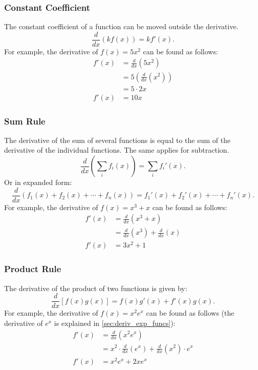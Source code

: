 \documentclass[12pt]{article}
\begin{document}
\subsubsection{Constant Coefficient}
The constant coefficient of a function can be moved outside the derivative.
\[ \frac{d}{dx} \left( k f(x) \right) = k f'(x). \]
For example, the derivative of $f(x) = 5x^2$ can be found as follows:
\begin{align*}
	f'(x) &= \frac{d}{dx} \left( 5x^2 \right) \\[5pt]
	&= 5 \left( \frac{d}{dx} \left( x^2 \right) \right) \\
	&= 5 \cdot 2x \\
	f'(x) &= 10x
\end{align*}

\subsubsection{Sum Rule}
The derivative of the sum of several functions is equal to the sum of the derivative of the individual functions. The same applies for subtraction.
\[ \frac{d}{dx} \left( \sum_i f_i(x) \right) = \sum_i f_i'(x). \]
Or in expanded form:
\[ \frac{d}{dx} \left( f_1(x) + f_2(x) + \cdots + f_n(x) \right) = f_1'(x) + f_2'(x) + \cdots + f_n'(x). \]
For example, the derivative of $f(x) = x^3 + x$ can be found as follows:
\begin{align*}
	f'(x) &= \frac{d}{dx} \left( x^3 + x \right) \\[5pt]
	&= \frac{d}{dx} \left( x^3 \right) + \frac{d}{dx} (x) \\[5pt]
	f'(x) &= 3x^2 + 1
\end{align*}

\subsubsection{Product Rule}
The derivative of the product of two functions is given by:
\[ \frac{d}{dx} \left[ f(x) g(x) \right] = f(x) g'(x) + f'(x) g(x). \]
For example, the derivative of $f(x) = x^2 e^x$ can be found as follows (the derivative of $e^x$ is explained in \autoref{sec:deriv_exp_funcs}):
\begin{align*}
	f'(x) &= \frac{d}{dx} \left( x^2 e^x \right) \\[5pt]
	&= x^2 \cdot \frac{d}{dx} \left( e^x \right) + \frac{d}{dx} \left( x^2 \right) \cdot e^x \\[5pt]
	f'(x) &= x^2 e^x + 2x e^x
\end{align*}
\end{document}
